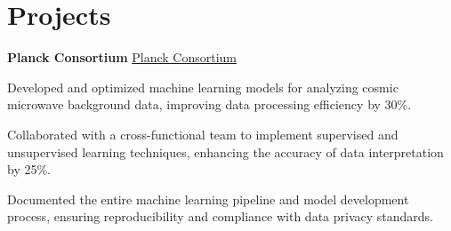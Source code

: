 \documentclass{modern} %
\begin{document}
\section{Projects}
    \begin{onecolentry}
        \textbf{Planck Consortium}
                    \href{http://cosmos.esa.int/web/planck}{Planck Consortium}
            \end{onecolentry}

    \vspace{0.10cm}
    \begin{onecolentry}
        \begin{highlights}
                            \item Developed and optimized machine learning models for analyzing cosmic microwave background data, improving data processing efficiency by 30\%.
                            \item Collaborated with a cross{-}functional team to implement supervised and unsupervised learning techniques, enhancing the accuracy of data interpretation by 25\%.
                            \item Documented the entire machine learning pipeline and model development process, ensuring reproducibility and compliance with data privacy standards.
                    \end{highlights}
    \end{onecolentry}

\end{document}
